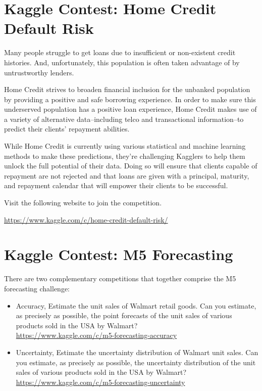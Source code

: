 \documentclass[11pt]{article}
\begin{document}
\newpage

\section{Kaggle Contest: Home Credit Default Risk}

Many people struggle to get loans due to insufficient or non-existent credit histories. And, unfortunately, this population is often taken advantage of by untrustworthy lenders.

Home Credit strives to broaden financial inclusion for the unbanked population by providing a positive and safe borrowing experience. In order to make sure this underserved population has a positive loan experience, Home Credit makes use of a variety of alternative data--including telco and transactional information--to predict their clients' repayment abilities.

While Home Credit is currently using various statistical and machine learning methods to make these predictions, they're challenging Kagglers to help them unlock the full potential of their data. Doing so will ensure that clients capable of repayment are not rejected and that loans are given with a principal, maturity, and repayment calendar that will empower their clients to be successful.

Visit the following website to join the competition. 

\url{https://www.kaggle.com/c/home-credit-default-risk/}

\section{Kaggle Contest: M5 Forecasting}

There are two complementary competitions that together comprise the M5 forecasting challenge: 
\begin{itemize}
\item Accuracy, Estimate the unit sales of Walmart retail goods. Can you estimate, as precisely as possible, the point forecasts of the unit sales of various products sold in the USA by Walmart? \\
\url{https://www.kaggle.com/c/m5-forecasting-accuracy}
\item Uncertainty, Estimate the uncertainty distribution of Walmart unit sales.  Can you estimate, as precisely as possible, the uncertainty distribution of the unit sales of various products sold in the USA by Walmart? \\
\url{https://www.kaggle.com/c/m5-forecasting-uncertainty}
\end{itemize}
\end{document}

